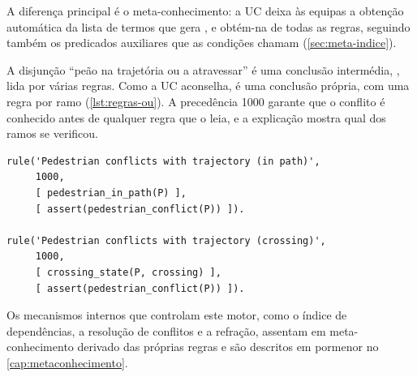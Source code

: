 A diferença principal é o meta-conhecimento: a UC deixa às equipas a obtenção
automática da lista de termos que gera , e
 obtém-na de todas as regras, seguindo também os predicados
auxiliares que as condições chamam (\cref{sec:meta-indice}).

A disjunção \enquote{peão na trajetória ou a atravessar} é uma conclusão
intermédia, , lida por várias regras. Como a UC
aconselha, é uma conclusão própria, com uma regra por ramo (\cref{lst:regras-ou}). A precedência
1000 garante que o conflito é conhecido antes de qualquer regra que o leia, e a
explicação mostra qual dos ramos se verificou.

\noindent\begin{minipage}{\linewidth}
\begin{lstlisting}[caption={Uma disjunção como duas regras (\texttt{driving\_rules.pl})},label=lst:regras-ou]
rule('Pedestrian conflicts with trajectory (in path)',
     1000,
     [ pedestrian_in_path(P) ],
     [ assert(pedestrian_conflict(P)) ]).

rule('Pedestrian conflicts with trajectory (crossing)',
     1000,
     [ crossing_state(P, crossing) ],
     [ assert(pedestrian_conflict(P)) ]).
\end{lstlisting}
\end{minipage}

Os mecanismos internos que controlam este motor, como o índice de dependências,
a resolução de conflitos e a refração, assentam em meta-conhecimento derivado das
próprias regras e são descritos em pormenor no \cref{cap:metaconhecimento}.
